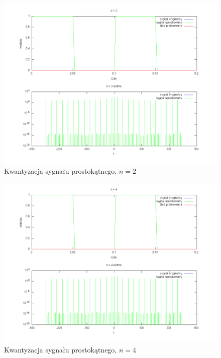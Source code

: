 \documentclass[wide,a4paper,titlepage,12pt]{mwart}
\begin{document}
	\begin{landscape}
	  \begin{figure}[htbp]
	    \begin{center}
	      \includegraphics[scale=.5]{out/kwant2-2.png}
	      \caption{\label{kwant2-2} Kwantyzacja sygnału prostokątnego, $n=2$}
	    \end{center}
	  \end{figure}
	\end{landscape}

	\begin{landscape}
	  \begin{figure}[htbp]
	    \begin{center}
	      \includegraphics[scale=.5]{out/kwant2-4.png}
	      \caption{\label{kwant2-4} Kwantyzacja sygnału prostokątnego, $n=4$}
	    \end{center}
	  \end{figure}
	\end{landscape}
\end{document}
